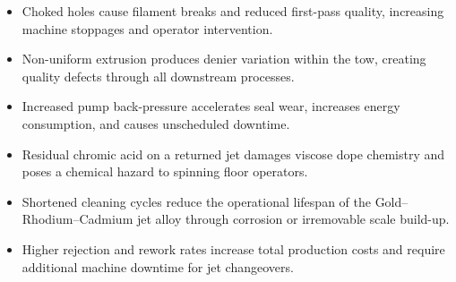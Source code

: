 \documentclass{book}
\begin{document}
\begin{itemize}[leftmargin=1.5em]
  \item Choked holes cause filament breaks and reduced first-pass quality, increasing machine stoppages and operator intervention.
  \item Non-uniform extrusion produces denier variation within the tow, creating quality defects through all downstream processes.
  \item Increased pump back-pressure accelerates seal wear, increases energy consumption, and causes unscheduled downtime.
  \item Residual chromic acid on a returned jet damages viscose dope chemistry and poses a chemical hazard to spinning floor operators.
  \item Shortened cleaning cycles reduce the operational lifespan of the Gold--Rhodium--Cadmium jet alloy through corrosion or irremovable scale build-up.
  \item Higher rejection and rework rates increase total production costs and require additional machine downtime for jet changeovers.
\end{itemize}


\end{document}
